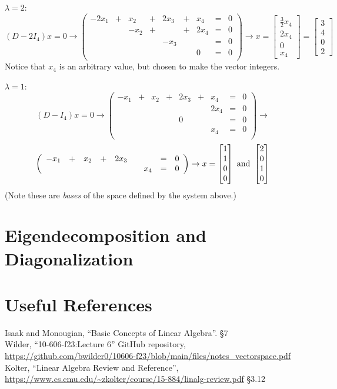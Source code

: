 $\lambda=2$:
\[(D-2I_4)x = 0 \rightarrow \left(\begin{array}{rcrcrcrcr} -2x_1 & + & x_2 & + & 2x_3 & + & x_4 & = & 0\\ &&-x_2 & + &  & + & 2x_4 & = & 0\\ &&&  & -x_3 &&&  = & 0\\ &&& &&& 0& = & 0\\\end{array}\right)\rightarrow x = \begin{bmatrix}\frac{3}{2}x_4\\2x_4\\0\\x_4\end{bmatrix}=\begin{bmatrix}3\\4\\0\\2\end{bmatrix}\]
Notice that $x_4$ is an arbitrary value, but chosen to make the vector integers.  

$\lambda=1$:
\[(D-I_4)x = 0 \rightarrow \left(\begin{array}{rcrcrcrcr} -x_1 & + & x_2 & + & 2x_3 & + & x_4 & = & 0\\ && & &  &  & 2x_4 & = & 0\\ &&&  & 0 &&&  = & 0\\ &&& &&& x_4 & = & 0\\\end{array}\right)\rightarrow\]
\[\left(\begin{array}{rcrcrcrcr}-x_1 & + & x_2 & + & 2x_3 &  &  & = & 0\\ &&& &&& x_4 & = & 0\\\end{array}\right) \rightarrow x = \begin{bmatrix}1\\1\\0\\0\end{bmatrix} \textnormal{ and }\begin{bmatrix}2\\0\\1\\0\end{bmatrix}\]
(Note these are \textit{bases} of the space defined by the system above.)


\section{Eigendecomposition and Diagonalization}


\section*{Useful References}
Isaak and Monougian, ``Basic Concepts of Linear Algebra''. \S 7\\
Wilder, ``10-606-f23:Lecture 6'' GitHub repository, \url{https://github.com/bwilder0/10606-f23/blob/main/files/notes_vectorspace.pdf}\\
Kolter, ``Linear Algebra Review and Reference'', \url{https://www.cs.cmu.edu/~zkolter/course/15-884/linalg-review.pdf} \S 3.12

